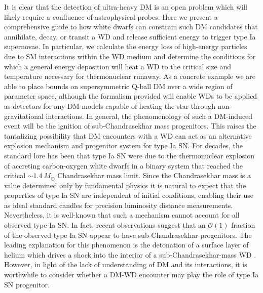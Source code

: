 \documentclass[twocolumn,preprintnumbers,amsmath,amssymb,prl, superscriptaddress]{revtex4}
\newcommand{\OO}{\mathcal{O}}
\begin{document}
It is clear that the detection of ultra-heavy DM is an open problem which will likely require a confluence of astrophysical probes.
Here we present a comprehensive guide to how white dwarfs can constrain such DM candidates that annihilate, decay, or transit a WD and release sufficient energy to trigger type Ia supernovae.
In particular, we calculate the energy loss of high-energy particles due to SM interactions within the WD medium and determine the conditions for which a general energy deposition will heat a WD to the critical size and temperature necessary for thermonuclear runaway.
As a concrete example we are able to place bounds on supersymmetric Q-ball DM over a wide region of parameter space, although the formalism provided will enable WDs to be applied as detectors for any DM models capable of heating the star through non-gravitational interactions.
In general, the phenomenology of such a DM-induced event will be the ignition of sub-Chandrasekhar mass progenitors.
This raises the tantalizing possibility that DM encounters with a WD can act as an alternative explosion mechanism and progenitor system for type Ia SN.
For decades, the standard lore has been that type Ia SN were due to the thermonuclear explosion of accreting carbon-oxygen white dwarfs in a binary system that reached the critical $\sim 1.4 ~M_{\odot}$ Chandrasekhar mass limit.
Since the Chandrasekhar mass is a value determined only by fundamental physics it is natural to expect that the properties of type Ia SN are independent of initial conditions, enabling their use as ideal standard candles for precision luminosity distance measurements.
Nevertheless, it is well-known that such a mechanism cannot account for all observed type Ia SN.
In fact, recent observations \cite{Scalzo:2014sap, Scalzo:2014wxa} suggest that an $\OO(1)$ fraction of the observed type Ia SN appear to have sub-Chandrasekhar progenitors.
The leading explanation for this phenomenon is the detonation of a surface layer of helium which drives a shock into the interior of a sub-Chandrasekhar-mass WD \cite{Woosley1994,Fink:2007fv}.
However, in light of the lack of understanding of DM and its interactions, it is worthwhile to consider whether a DM-WD encounter may play the role of type Ia SN progenitor.
\end{document}
